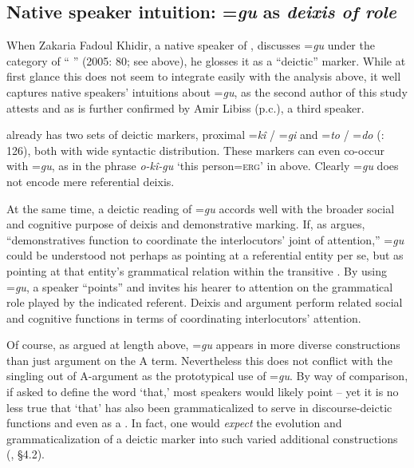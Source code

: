 \documentclass[output=paper,modfonts]{langscibook}
\begin{document}
\subsection{Native speaker intuition: =\textit{gu} as \textit{deixis of role}}\label{sec:wolfe:3.7}
When Zakaria Fadoul Khidir, a native speaker of  , discusses =\textit{gu} under the category of “ ” (2005: 80; see  above), he glosses it as a “deictic” marker. While at first glance this does not seem to integrate easily with the analysis above, it well captures native speakers’ intuitions about =\textit{gu}, as the second author of this study attests and as is further confirmed by Amir Libiss (p.c.), a third  speaker. 

 already has two sets of deictic markers, proximal =\textit{kî} / =\textit{gi} and  =\textit{to} / =\textit{do} (\citealt{JakobiCrass2004}: 126), both with wide syntactic distribution. These markers can even co-occur with =\textit{gu}, as in the  phrase \textit{o-kî-gu} ‘this person=\textsc{erg}’ in  above. Clearly =\textit{gu} does not encode mere referential deixis.

At the same time, a deictic reading of =\textit{gu} accords well with the broader social and cognitive purpose of deixis and demonstrative marking. If, as \citet[463]{Diessel2006} argues, “demonstratives function to coordinate the interlocutors’ joint  of attention,” =\textit{gu} could be understood not perhaps as pointing at a referential entity per se, but as pointing at that entity’s grammatical relation within the transitive . By using =\textit{gu}, a speaker “points” and invites his hearer to  attention on the  grammatical role played by the indicated referent. Deixis and argument  perform related social and cognitive functions in terms of coordinating interlocutors’ attention.

Of course, as argued at length above, =\textit{gu} appears in more diverse constructions than just argument  on the A term. Nevertheless this does not conflict with the singling out of A-argument  as the prototypical use of =\textit{gu}. By way of comparison, if asked to define the word ‘that,’ most  speakers would likely point – yet it is no less true that  ‘that’ has also been grammaticalized to serve in discourse-deictic functions and even as a . In fact, one would \textit{expect} the evolution and grammaticalization of a deictic marker into such varied additional constructions (\citealt{Diessel2006}, §4.2).
\end{document}

